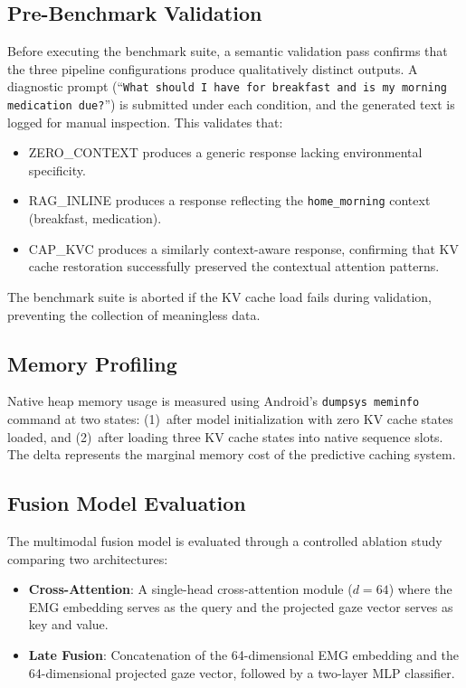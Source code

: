 \documentclass[journal]{IEEEtran}
\begin{document}
\subsection{Pre-Benchmark Validation}
\label{sec:validation}

Before executing the benchmark suite, a semantic validation pass confirms that the three pipeline configurations produce qualitatively distinct outputs. A diagnostic prompt (``\texttt{What should I have for breakfast and is my morning medication due?}'') is submitted under each condition, and the generated text is logged for manual inspection. This validates that:

\begin{itemize}
    \item ZERO\_CONTEXT produces a generic response lacking environmental specificity.
    \item RAG\_INLINE produces a response reflecting the \texttt{home\_morning} context (breakfast, medication).
    \item CAP\_KVC produces a similarly context-aware response, confirming that KV cache restoration successfully preserved the contextual attention patterns.
\end{itemize}

The benchmark suite is aborted if the KV cache load fails during validation, preventing the collection of meaningless data.

\subsection{Memory Profiling}
\label{sec:memory_profiling}

Native heap memory usage is measured using Android's \texttt{dumpsys meminfo} command at two states: (1)~after model initialization with zero KV cache states loaded, and (2)~after loading three KV cache states into native sequence slots. The delta represents the marginal memory cost of the predictive caching system.

\subsection{Fusion Model Evaluation}
\label{sec:fusion_eval}

The multimodal fusion model is evaluated through a controlled ablation study comparing two architectures:

\begin{itemize}
    \item \textbf{Cross-Attention}: A single-head cross-attention module ($d = 64$) where the EMG embedding serves as the query and the projected gaze vector serves as key and value.
    \item \textbf{Late Fusion}: Concatenation of the 64-dimensional EMG embedding and the 64-dimensional projected gaze vector, followed by a two-layer MLP classifier.
\end{itemize}
\end{document}
